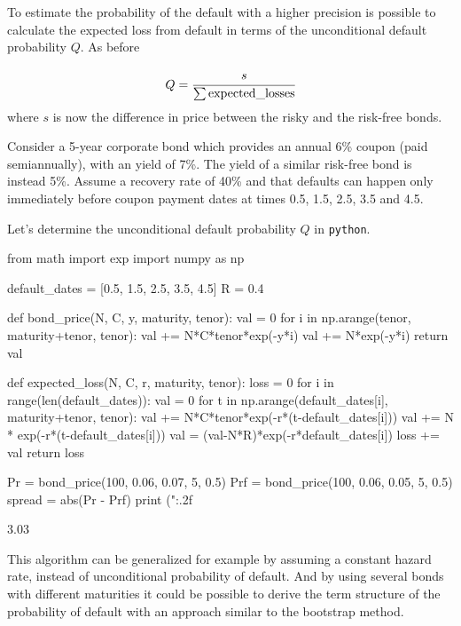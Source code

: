 To estimate the probability of the default with a higher precision is possible to calculate the expected loss from default in terms of the unconditional default probability $Q$. As before

\begin{equation}
Q = \cfrac{s}{\sum\mathrm{expected\_losses}}
\end{equation}
where $s$ is now the difference in price between the risky and the risk-free bonds.

Consider a 5-year corporate bond which provides an annual 6\% coupon (paid semiannually), with an yield of 7\%. The yield of a similar risk-free bond is instead 5\%. Assume a recovery rate of 40\% and that defaults can happen only immediately before coupon payment dates at times 0.5, 1.5, 2.5, 3.5 and 4.5. 

Let's determine the unconditional default probability $Q$ in \texttt{python}.

\begin{ipython}
from math import exp
import numpy as np

default_dates = [0.5, 1.5, 2.5, 3.5, 4.5]
R = 0.4

def bond_price(N, C, y, maturity, tenor):
    val = 0
    for i in np.arange(tenor, maturity+tenor, tenor):
        val += N*C*tenor*exp(-y*i)
    val += N*exp(-y*i)
    return val

def expected_loss(N, C, r, maturity, tenor):
    loss = 0
    for i in range(len(default_dates)):
        val = 0
        for t in np.arange(default_dates[i], maturity+tenor, tenor):
            val += N*C*tenor*exp(-r*(t-default_dates[i]))
        val += N * exp(-r*(t-default_dates[i]))
        val = (val-N*R)*exp(-r*default_dates[i])
        loss += val
    return loss

Pr = bond_price(100, 0.06, 0.07, 5, 0.5)
Prf = bond_price(100, 0.06, 0.05, 5, 0.5)
spread = abs(Pr - Prf)
print ("{:.2f}%
\end{ipython}
\begin{ioutput}
3.03%
\end{ioutput}

This algorithm can be generalized for example by assuming a constant hazard rate, instead of unconditional probability of default. And by using several bonds with different maturities it could be possible to derive the term structure of the probability of default with an approach similar to the bootstrap method.

